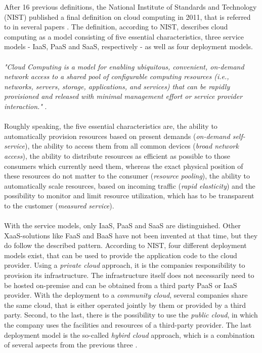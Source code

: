 \documentclass[a4paper,11pt, pagesize]{scrartcl}
\begin{document}
\begin{spacing}{1.2}
After 16 previous definitions, the National Institute of Standards and Technology (NIST) published a final definition on cloud computing in 2011, that is referred to in several papers \cite{mell2011nist}. The definition, according to NIST, describes cloud computing as a model consisting of five essential characteristics, three service models - IaaS, PaaS and SaaS, respectively - as well as four deployment models. \\\\ \textit{"Cloud Computing is a model for enabling ubiquitous, convenient, on-demand network access to a shared pool of configurable computing resources (i.e., networks, servers, storage, applications, and services) that can be rapidly provisioned and released with minimal management effort or service provider interaction."} \cite{mell2011nist}.\\\\ Roughly speaking, the five essential characteristics are, the ability to automatically provision resources based on present demands (\textit{on-demand self-service}), the ability to access them from all common devices (\textit{broad network access}), the ability to distribute resources as efficient as possible to those consumers which currently need them, whereas the exact physical position of these resources do not matter to the consumer (\textit{resource pooling}), the ability to automatically scale resources, based on incoming traffic (\textit{rapid elasticity}) and the possibility to monitor and limit resource utilization, which has to be transparent to the customer (\textit{measured service}). \\\\ With the service models, only IaaS, PaaS and SaaS are distinguished. Other XaaS-solutions like FaaS and BaaS have not been invented at that time, but they do follow the described pattern. According to NIST, four different deployment models exist, that can be used to provide the application code to the cloud provider. Using a \textit{private cloud} approach, it is the companies responsibility to provision its infrastructure. The infrastructure itself does not necessarily need to be hosted on-premise and can be obtained from a third party PaaS or IaaS provider. With the deployment to a \textit{community cloud}, several companies share the same cloud, that is either operated jointly by them or provided by a third party. Second, to the last, there is the possibility to use the \textit{public cloud}, in which the company uses the facilities and resources of a third-party provider. The last deployment model is the so-called \textit{hybird cloud} approach, which is a combination of several aspects from the previous three \cite{mell2011nist}.

\end{spacing}
\end{document}
